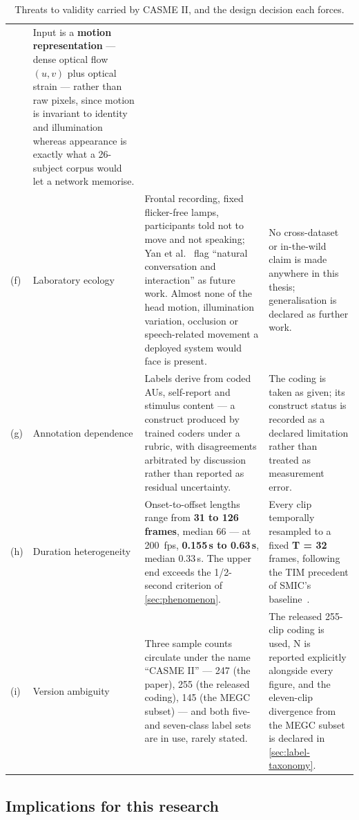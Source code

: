 \begin{table}[htbp]
\begin{tabular}{@{}p{0.3cm} p{2.0cm} p{5.3cm} p{5.6cm}@{}}
		& Input is a \textbf{motion representation} --- dense optical flow $(u,v)$ plus optical strain --- rather than raw pixels, since motion is invariant to identity and illumination whereas appearance is exactly what a 26-subject corpus would let a network memorise. \\
		(f) & Laboratory ecology
		& Frontal recording, fixed flicker-free lamps, participants told not to move and not speaking; Yan et al.~\cite{yan2014} flag ``natural conversation and interaction'' as future work. Almost none of the head motion, illumination variation, occlusion or speech-related movement a deployed system would face is present.
		& No cross-dataset or in-the-wild claim is made anywhere in this thesis; generalisation is declared as further work. \\
		(g) & Annotation dependence
		& Labels derive from coded AUs, self-report and stimulus content --- a construct produced by trained coders under a rubric, with disagreements arbitrated by discussion rather than reported as residual uncertainty.
		& The coding is taken as given; its construct status is recorded as a declared limitation rather than treated as measurement error. \\
		(h) & Duration heterogeneity
		& Onset-to-offset lengths range from \textbf{31 to 126 frames}, median 66 --- at 200~fps, \textbf{0.155\,s to 0.63\,s}, median 0.33\,s. The upper end exceeds the 1/2-second criterion of \autoref{sec:phenomenon}.
		& Every clip temporally resampled to a fixed \textbf{T = 32} frames, following the TIM precedent of SMIC's baseline~\cite{liX2013}. \\
		(i) & Version ambiguity
		& Three sample counts circulate under the name ``CASME II'' --- 247 (the paper), 255 (the released coding), 145 (the MEGC subset) --- and both five- and seven-class label sets are in use, rarely stated.
		& The released 255-clip coding is used, N is reported explicitly alongside every figure, and the eleven-clip divergence from the MEGC subset is declared in \autoref{sec:label-taxonomy}. \\
		\hline
	\end{tabular}
	\caption[Threats to validity carried by CASME II and the decisions they force]{Threats to validity carried by CASME II, and the design decision each forces.}
	\label{tab:corpus-threats}
\end{table}

\subsection{Implications for this research}
\label{sec:corpus-implications}

